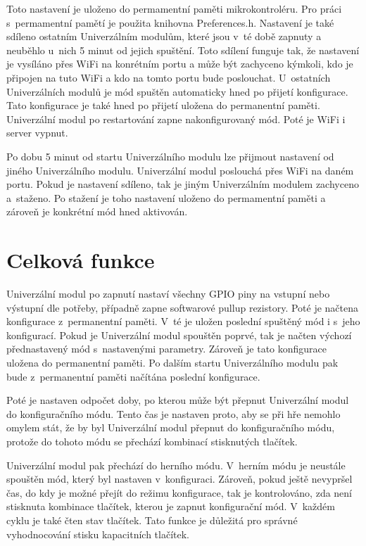 Toto nastavení je uloženo do permamentní paměti mikrokontroléru. Pro práci s~permamentní pamětí je použita knihovna Preferences.h. Nastavení je také sdíleno ostatním Univerzálním modulům, které jsou v~té době zapnuty 
a neuběhlo u~nich 5 minut od jejich spuštění. Toto sdílení funguje tak, že nastavení je vysíláno přes WiFi na konrétním portu a může být zachyceno kýmkoli, kdo je připojen na tuto WiFi a kdo na tomto portu bude 
poslouchat. U~ostatních Univerzálních modulů je mód spuštěn automaticky hned po přijetí konfigurace. Tato konfigurace je také hned po přijetí uložena do permanentní paměti. Univerzální modul po restartování zapne 
nakonfigurovaný mód. Poté je WiFi i server vypnut. 

Po dobu 5 minut od startu Univerzálního modulu lze přijmout nastavení od jiného Univerzálního modulu. Univerzální modul poslouchá přes WiFi na daném portu. Pokud je nastavení sdíleno, tak je jiným Univerzálním modulem 
zachyceno a~staženo. Po stažení je toho nastavení uloženo do permamentní paměti a zároveň je konkrétní mód hned aktivován. 

\section{Celková funkce}
Univerzální modul po zapnutí nastaví všechny GPIO piny na vstupní nebo výstupní dle potřeby, případně zapne softwarové pullup rezistory. Poté je načtena konfigurace z~permanentní paměti. V~té je uložen poslední spuštěný 
mód  
i s~jeho konfigurací. Pokud je Univerzální modul spouštěn poprvé, tak je načten výchozí přednastavený mód s~nastavenými parametry. Zároveň je tato konfigurace uložena do permanentní paměti. Po dalším startu 
Univerzálního modulu pak bude z~permanentní paměti načítána poslední konfigurace. 

Poté je nastaven odpočet doby, po kterou může být přepnut Univerzální modul do konfiguračního módu. Tento čas je nastaven proto, aby se při hře nemohlo omylem stát, že by byl Univerzální modul přepnut do 
konfiguračního módu, protože do tohoto módu se přechází kombinací stisknutých tlačítek. 

Univerzální modul pak přechází do herního módu. V~herním módu je neustále spouštěn mód, který byl nastaven v~konfiguraci. Zároveň, pokud ještě nevypršel čas, do kdy je možné přejít do režimu konfigurace, tak 
je kontrolováno, zda není stisknuta kombinace tlačítek, kterou je zapnut konfigurační mód. V~každém cyklu je také čten stav tlačítek. Tato funkce je důležitá pro správné vyhodnocování stisku kapacitních tlačítek. 

